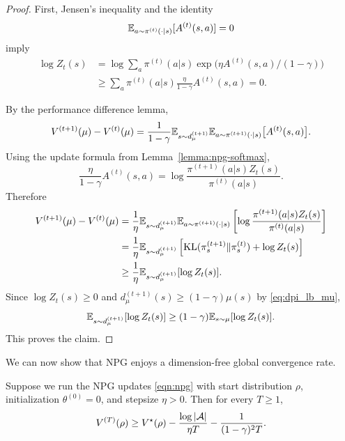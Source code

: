 \begin{proof}
First, Jensen's inequality and the identity
\[
\mathbb{E}_{a\sim \pi^{(t)}(\cdot|s)}[A^{(t)}(s,a)]=0
\]
imply
\begin{align*}
\log Z_t(s)
&=
\log \sum_a \pi^{(t)}(a|s)\exp\!\big(\eta A^{(t)}(s,a)/(1-\gamma)\big) \\
&\ge
\sum_a \pi^{(t)}(a|s)\frac{\eta}{1-\gamma}A^{(t)}(s,a)
=
0.
\end{align*}

By the performance difference lemma,
\[
V^{(t+1)}(\mu)-V^{(t)}(\mu)
=
\frac{1}{1-\gamma}
\mathbb{E}_{s\sim d_\mu^{(t+1)}}
\mathbb{E}_{a\sim \pi^{(t+1)}(\cdot|s)}
\big[A^{(t)}(s,a)\big].
\]
Using the update formula from Lemma~\ref{lemma:npg-softmax},
\[
\frac{\eta}{1-\gamma}A^{(t)}(s,a)
=
\log \frac{\pi^{(t+1)}(a|s)Z_t(s)}{\pi^{(t)}(a|s)}.
\]
Therefore
\begin{align*}
V^{(t+1)}(\mu)-V^{(t)}(\mu)
&=
\frac{1}{\eta}
\mathbb{E}_{s\sim d_\mu^{(t+1)}}
\mathbb{E}_{a\sim \pi^{(t+1)}(\cdot|s)}
\left[
\log \frac{\pi^{(t+1)}(a|s)Z_t(s)}{\pi^{(t)}(a|s)}
\right] \\
&=
\frac{1}{\eta}
\mathbb{E}_{s\sim d_\mu^{(t+1)}}
\left[
\mathrm{KL}(\pi_s^{(t+1)}\|\pi_s^{(t)})
+
\log Z_t(s)
\right] \\
&\ge
\frac{1}{\eta}
\mathbb{E}_{s\sim d_\mu^{(t+1)}}[\log Z_t(s)].
\end{align*}
Since $\log Z_t(s)\ge 0$ and $d_\mu^{(t+1)}(s)\ge (1-\gamma)\mu(s)$ by \eqref{eq:dpi_lb_mu},
\[
\mathbb{E}_{s\sim d_\mu^{(t+1)}}[\log Z_t(s)]
\ge
(1-\gamma)\mathbb{E}_{s\sim \mu}[\log Z_t(s)].
\]
This proves the claim.
\end{proof}

We can now show that NPG enjoys a dimension-free global convergence rate.

\begin{theorem}
\label{thm:npg}
Suppose we run the NPG updates \eqref{eqn:npg} with start distribution $\rho$,
initialization $\theta^{(0)}=0$, and stepsize $\eta>0$.
Then for every $T\ge 1$,
\[
V^{(T)}(\rho)
\ge
V^\star(\rho)
-
\frac{\log |\mathcal{A}|}{\eta T}
-
\frac{1}{(1-\gamma)^2 T}.
\]
\end{theorem}


